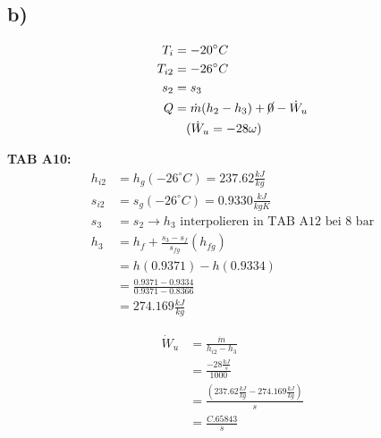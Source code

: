 

\subsection*{b)}

\begin{align*}
    T_i &= -20^\circ C \\
    T_{i2} &= -26^\circ C \\
    s_2 &= s_3 \\
    Q &= \dot{m} (h_2 - h_3) + \cancel{0} - \dot{W}_u \\
    & \quad (\dot{W}_u = -28 \omega)
\end{align*}

\textbf{TAB A10:}
\begin{align*}
    h_{i2} &= h_g (-26^\circ C) = 237.62 \frac{kJ}{kg} \\
    s_{i2} &= s_g (-26^\circ C) = 0.9330 \frac{kJ}{kgK} \\
    s_3 &= s_2 \rightarrow h_3 \text{ interpolieren in TAB A12 bei } 8 \text{ bar} \\
    h_3 &= h_{f} + \frac{s_3 - s_{f}}{s_{fg}} (h_{fg}) \\
    &= h(0.9371) - h(0.9334) \\
    &= \frac{0.9371 - 0.9334}{0.9371 - 0.8366} \\
    &= 274.169 \frac{kJ}{kg}
\end{align*}

\begin{align*}
    \dot{W}_u &= \frac{\dot{m}}{h_{i2} - h_3} \\
    &= \frac{-28 \frac{kJ}{s}}{1000} \\
    &= \frac{(237.62 \frac{kJ}{kg} - 274.169 \frac{kJ}{kg})}{s} \\
    &= \frac{C.65843}{s}
\end{align*}